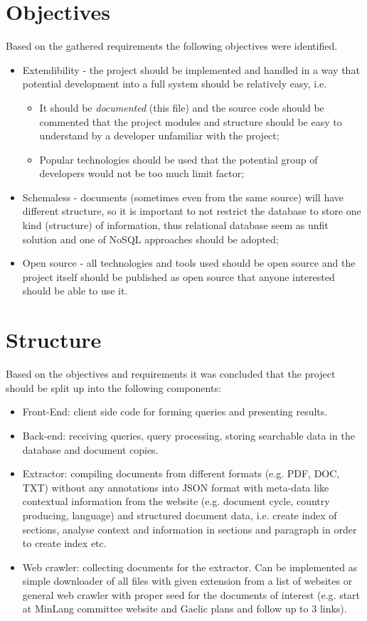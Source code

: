 \documentclass[a4paper]{tufte-book}
\begin{document}
\section{Objectives}
Based on the gathered requirements the following objectives were identified.
\begin{itemize}
  \item Extendibility - the project should be implemented and handled in a way that potential development into a full system should be relatively easy, i.e.
    \begin{itemize}
      \item It should be \emph{documented} (this file) and the source code should be commented that the project modules and structure should be easy to understand by a developer unfamiliar with the project;
      \item Popular technologies should be used that the potential group of developers would not be too much limit factor;
    \end{itemize}
  \item Schemaless - documents (sometimes even from the same source) will have different structure, so it is important to not restrict the database to store one kind (structure) of information, thus relational database seem as unfit solution and one of NoSQL approaches should be adopted;
  \item Open source - all technologies and tools used should be open source and the project itself should be published as open source that anyone interested should be able to use it.
\end{itemize}

\section{Structure}
Based on the objectives and requirements it was concluded that the project should be split up into the following components:
\begin{itemize}
  \item Front-End: client side code for forming queries and presenting results.
  \item Back-end: receiving queries, query processing, storing searchable data in the database and document copies.
  \item Extractor: compiling documents from different formats (e.g. PDF, DOC, TXT) without any annotations into JSON format with meta-data like contextual information from the website (e.g. document cycle, country producing, language) and structured document data, i.e. create index of sections, analyse context and information in sections and paragraph in order to create index etc.
  \item Web crawler: collecting documents for the extractor. Can be implemented as simple downloader of all files with given extension from a list of websites or general web crawler with proper seed for the documents of interest (e.g. start at MinLang committee website and Gaelic plans and follow up to 3 links).
\end{itemize}
\end{document}
